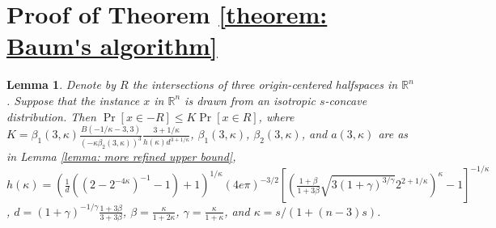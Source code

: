 \documentclass[11pt]{article}
\newcommand{\R}{\mathbb{R}}
\newtheorem{lemma}[theorem]{Lemma}
\begin{document}
{{{{\section{Proof of Theorem \ref{theorem: Baum's algorithm}}
\begin{lemma}
\label{lemma: isotropic reflection}
Denote by $R$ the intersections of three origin-centered halfspaces in $\R^n$. Suppose that the instance $x$ in $\R^n$ is drawn from an isotropic $s$-concave distribution. Then $\Pr[x\in-R]\le K\Pr[x\in R]$, where $K=\beta_1(3,\kappa)\frac{B(-1/\kappa-3,3)}{(-\kappa\beta_2(3,\kappa))^3}\frac{3+1/\kappa}{h(\kappa)d^{3+1/\kappa}}$,
$\beta_1(3,\kappa)$, $\beta_2(3,\kappa)$, and $a(3,\kappa)$ are as in Lemma \ref{lemma: more refined upper bound},
$h(\kappa)=\left(\frac{1}{d}((2-2^{-4\kappa})^{-1}-1)+1\right)^{1/\kappa}(4e\pi)^{-3/2}\left[\left(\frac{1+\beta}{1+3\beta}\sqrt{3(1+\gamma)^{3/\gamma}}2^{2+1/\kappa}\right)^{\kappa}-1\right]^{-1/\kappa}$,
$d=(1+\gamma)^{-1/\gamma}\frac{1+3\beta}{3+3\beta}$, $\beta=\frac{\kappa}{1+2\kappa}$, $\gamma=\frac{\kappa}{1+\kappa}$, and $\kappa=s/(1+(n-3)s)$.
\end{lemma}


}}}}
\end{document}
